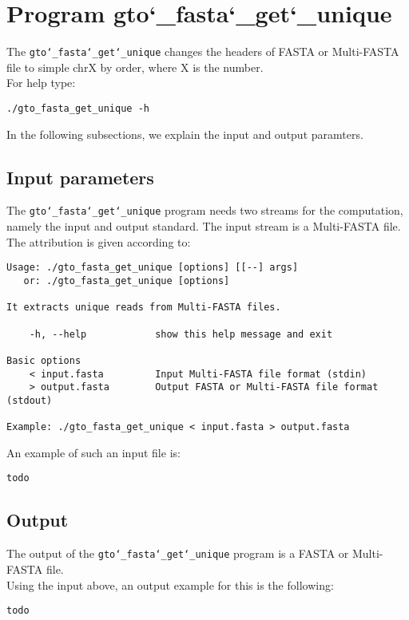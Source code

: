 \section{Program gto\char`_fasta\char`_get\char`_unique}
The \texttt{gto\char`_fasta\char`_get\char`_unique} changes the headers of FASTA or Multi-FASTA file to simple chrX by order, where X is the number.\\
For help type:
\begin{lstlisting}
./gto_fasta_get_unique -h
\end{lstlisting}
In the following subsections, we explain the input and output paramters.

\subsection*{Input parameters}

The \texttt{gto\char`_fasta\char`_get\char`_unique} program needs two streams for the computation, namely the input and output standard. The input stream is a Multi-FASTA file.\\
The attribution is given according to:
\begin{lstlisting}
Usage: ./gto_fasta_get_unique [options] [[--] args]
   or: ./gto_fasta_get_unique [options]

It extracts unique reads from Multi-FASTA files.

    -h, --help            show this help message and exit

Basic options
    < input.fasta         Input Multi-FASTA file format (stdin)
    > output.fasta        Output FASTA or Multi-FASTA file format (stdout)

Example: ./gto_fasta_get_unique < input.fasta > output.fasta
\end{lstlisting}
An example of such an input file is:
\begin{lstlisting}
todo
\end{lstlisting}

\subsection*{Output}
The output of the \texttt{gto\char`_fasta\char`_get\char`_unique} program is a FASTA or Multi-FASTA file.\\
Using the input above, an output example for this is the following:
\begin{lstlisting}
todo
\end{lstlisting}
